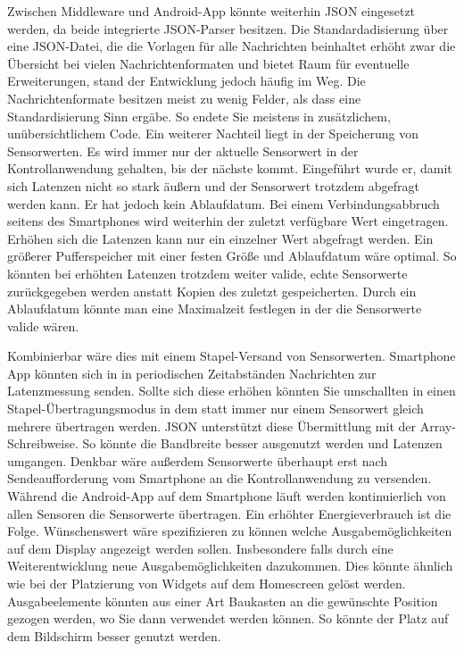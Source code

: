 \documentclass[11pt,a4paper]{report}
\begin{document}
Zwischen Middleware und Android-App könnte weiterhin JSON eingesetzt werden, da beide integrierte JSON-Parser besitzen.
Die Standardadisierung über eine JSON-Datei, die die Vorlagen für alle Nachrichten beinhaltet erhöht zwar die Übersicht bei vielen Nachrichtenformaten und bietet Raum für eventuelle Erweiterungen, stand der Entwicklung jedoch häufig im Weg.
Die Nachrichtenformate besitzen meist zu wenig Felder, als dass eine Standardisierung Sinn ergäbe.
So endete Sie meistens in zusätzlichem, unübersichtlichem Code.
Ein weiterer Nachteil liegt in der Speicherung von Sensorwerten.
Es wird immer nur der aktuelle Sensorwert in der Kontrollanwendung gehalten, bis der nächste kommt.
Eingeführt wurde er, damit sich Latenzen nicht so stark äußern und der Sensorwert trotzdem abgefragt werden kann.
Er hat jedoch kein Ablaufdatum.
Bei einem Verbindungsabbruch seitens des Smartphones wird weiterhin der zuletzt verfügbare Wert eingetragen.
Erhöhen sich die Latenzen kann nur ein einzelner Wert abgefragt werden.
Ein größerer Pufferspeicher mit einer festen Größe und Ablaufdatum wäre optimal.
So könnten bei erhöhten Latenzen trotzdem weiter valide, echte Sensorwerte zurückgegeben werden anstatt Kopien des zuletzt gespeicherten.
Durch ein Ablaufdatum könnte man eine Maximalzeit festlegen in der die Sensorwerte valide wären.

Kombinierbar wäre dies mit einem Stapel-Versand von Sensorwerten.
Smartphone App könnten sich in in periodischen Zeitabständen Nachrichten zur Latenzmessung senden.
Sollte sich diese erhöhen könnten Sie umschallten in einen Stapel-Übertragungsmodus in dem statt immer nur einem Sensorwert gleich mehrere übertragen werden.
JSON unterstützt diese Übermittlung mit der Array-Schreibweise.
So könnte die Bandbreite besser ausgenutzt werden und Latenzen umgangen.
Denkbar wäre außerdem Sensorwerte überhaupt erst nach Sendeaufforderung vom Smartphone an die Kontrollanwendung zu versenden.
Während die Android-App auf dem Smartphone läuft werden kontinuierlich von allen Sensoren die Sensorwerte übertragen.
Ein erhöhter Energieverbrauch ist die Folge.
Wünschenswert wäre spezifizieren zu können welche Ausgabemöglichkeiten auf dem Display angezeigt werden sollen.
Insbesondere falls durch eine Weiterentwicklung neue Ausgabemöglichkeiten dazukommen.
Dies könnte ähnlich wie bei der Platzierung von Widgets auf dem Homescreen gelöst werden.
Ausgabeelemente könnten aus einer Art Baukasten an die gewünschte Position gezogen werden, wo Sie dann verwendet werden können.
So könnte der Platz auf dem Bildschirm besser genutzt werden.
\end{document}
